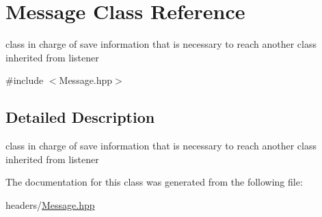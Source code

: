 \hypertarget{class_message}{}\section{Message Class Reference}
\label{class_message}


class in charge of save information that is necessary to reach another class inherited from listener  




{\ttfamily \#include $<$Message.\+hpp$>$}



\subsection{Detailed Description}
class in charge of save information that is necessary to reach another class inherited from listener 

The documentation for this class was generated from the following file\+:\begin{DoxyCompactItemize}
\item 
headers/\mbox{\hyperlink{_message_8hpp}{Message.\+hpp}}\end{DoxyCompactItemize}
